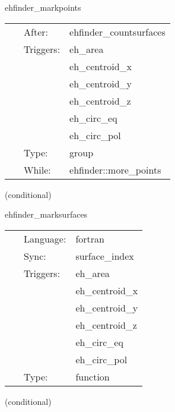 \hspace{5mm} ehfinder\_markpoints 

\hspace{5mm}{\it marking surfaces } 


\hspace{5mm}

 \begin{tabular*}{160mm}{cll} 
~ & After:  & ehfinder\_countsurfaces \\ 
~ & Triggers:  & eh\_area \\ 
~& ~ &eh\_centroid\_x\\ 
~& ~ &eh\_centroid\_y\\ 
~& ~ &eh\_centroid\_z\\ 
~& ~ &eh\_circ\_eq\\ 
~& ~ &eh\_circ\_pol\\ 
~ & Type:  & group \\ 
~ & While:  & ehfinder::more\_points \\ 
\end{tabular*} 


\vspace{5mm}

   (conditional) 

\hspace{5mm} ehfinder\_marksurfaces 

\hspace{5mm}{\it mark points inside the current surface } 


\hspace{5mm}

 \begin{tabular*}{160mm}{cll} 
~ & Language:  & fortran \\ 
~ & Sync:  & surface\_index \\ 
~ & Triggers:  & eh\_area \\ 
~& ~ &eh\_centroid\_x\\ 
~& ~ &eh\_centroid\_y\\ 
~& ~ &eh\_centroid\_z\\ 
~& ~ &eh\_circ\_eq\\ 
~& ~ &eh\_circ\_pol\\ 
~ & Type:  & function \\ 
\end{tabular*} 


\vspace{5mm}

   (conditional) 

